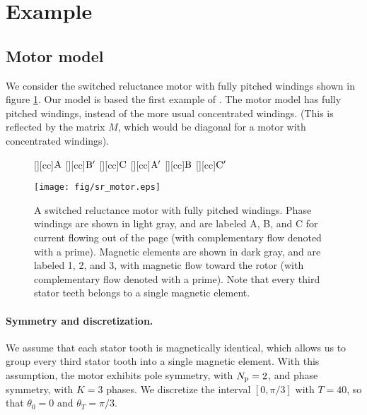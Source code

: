 \documentclass[11pt]{article}
\newif\ifarxiv
\begin{document}
\section{Example}
\label{s-example}

\subsection{Motor model}
We consider the switched reluctance motor with fully pitched windings shown in 
figure \ref{f-sr-motor}.
Our model is based the first example of \cite{mecrow2001modeling}.
The motor model has fully pitched windings,
instead of the more usual concentrated windings.
(This is reflected by the matrix $M$,
which would be diagonal for a motor with concentrated windings).

\begin{figure} 
\begin{center}
[][cc]{$\rm A$} 
[][cc]{$\rm B'$} 
[][cc]{$\rm C$} 
[][cc]{$\rm A'$} 
[][cc]{$\rm B$} 
[][cc]{$\rm C'$} 
\ifarxiv
\texttt{[image: sr\_motor.eps]}
\else
\texttt{[image: fig/sr\_motor.eps]}
\fi
\caption{
A switched reluctance motor with fully pitched windings.
Phase windings are shown in light gray, and are labeled A, B, and C
for current flowing out of the page
(with complementary flow denoted with a prime).
Magnetic elements are shown in dark gray, 
and are labeled 1, 2, and 3, with magnetic flow toward the rotor
(with complementary flow denoted with a prime).
Note that every third stator teeth belongs to a single magnetic element.
}
\label{f-sr-motor}
\end{center}
\end{figure}

\paragraph{Symmetry and discretization.}
We assume that each stator tooth is magnetically identical,
which allows us to group every third stator tooth into a single magnetic element.
With this assumption,
the motor exhibits pole symmetry, with $N_{\rm p} = 2$,
and phase symmetry, with $K = 3$ phases.
We discretize the interval $[0, \pi/3]$ with $T = 40$,
so that $\theta_0 = 0$ and $\theta_T = \pi/3$.
\end{document}
